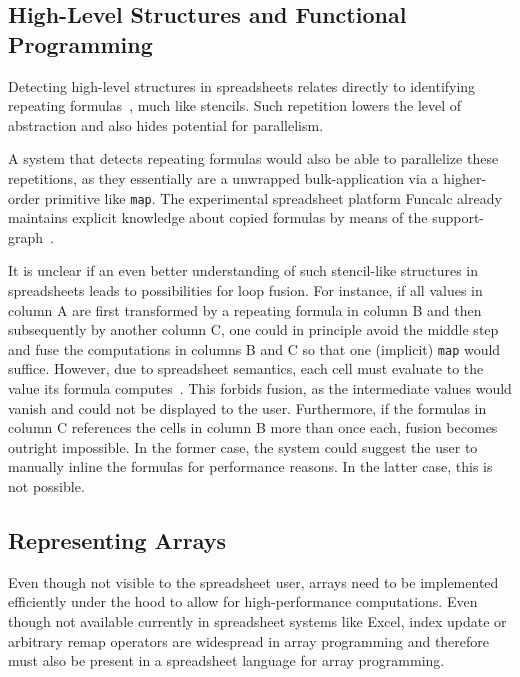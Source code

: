 \documentclass[a4paper]{article}
\begin{document}
\subsection{High-Level Structures and Functional Programming}
\label{sec:high-level-struct}

Detecting high-level structures in spreadsheets relates directly to identifying repeating formulas~\cite{1173080}, much like stencils. Such repetition lowers the level of abstraction and also hides potential for parallelism.

A system that detects repeating formulas would also be able to parallelize these repetitions, as they essentially are a unwrapped bulk-application via a higher-order primitive like \texttt{map}. The experimental spreadsheet platform Funcalc already maintains explicit knowledge about copied formulas by means of the support-graph~\cite{Sestoft2014Spreadsheet}.

It is unclear if an even better understanding of such stencil-like structures in spreadsheets leads to possibilities for loop fusion. For instance, if all values in column A are first transformed by a repeating formula in column B and then subsequently by another column C, one could in principle avoid the middle step and fuse the computations in columns B and C so that one (implicit) \texttt{map} would suffice. However, due to spreadsheet semantics, each cell must evaluate to the value its formula computes~\cite{Sestoft2014Spreadsheet}. This forbids fusion, as the intermediate values would vanish and could not be displayed to the user. Furthermore, if the formulas in column C references the cells in column B more than once each, fusion becomes outright impossible. In the former case, the system could suggest the user to manually inline the formulas for performance reasons. In the latter case, this is not possible.

\subsection{Representing Arrays}
\label{sec:representing-arrays}

Even though not visible to the spreadsheet user, arrays need to be implemented efficiently under the hood to allow for high-performance computations. Even though not available currently in spreadsheet systems like Excel, index update or arbitrary remap operators are widespread in array programming and therefore must also be present in a spreadsheet language for array programming.
\end{document}
